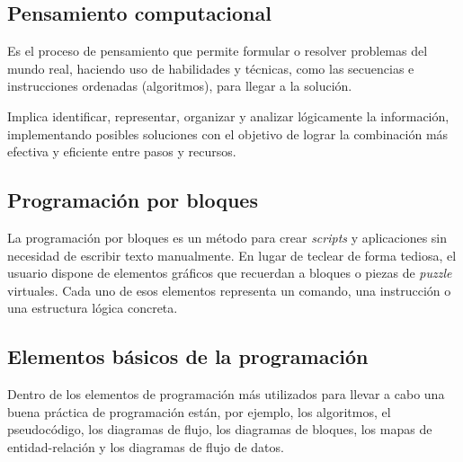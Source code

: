\documentclass[12pt,letterpaper]{article}
\begin{document}
\subsection{Pensamiento computacional}
Es el proceso de pensamiento que permite formular o resolver problemas del mundo real, haciendo uso de habilidades y técnicas, como las secuencias e instrucciones ordenadas (algoritmos), para llegar a la solución.

Implica identificar, representar, organizar y analizar lógicamente la información, implementando posibles soluciones con el objetivo de lograr la combinación más efectiva y eficiente entre pasos y recursos.

\subsection{Programación por bloques}
La programación por bloques es un método para crear \textit{scripts} y aplicaciones sin necesidad de escribir texto manualmente. En lugar de teclear de forma tediosa, el usuario dispone de elementos gráficos que recuerdan a bloques o piezas de \textit{puzzle} virtuales. Cada uno de esos elementos representa un comando, una instrucción o una estructura lógica concreta.

\subsection{Elementos básicos de la programación}
Dentro de los elementos de programación más utilizados para llevar a cabo una buena práctica de programación están, por ejemplo, los algoritmos, el pseudocódigo, los diagramas de flujo, los diagramas de bloques, los mapas de entidad-relación y los diagramas de flujo de datos.
\end{document}
